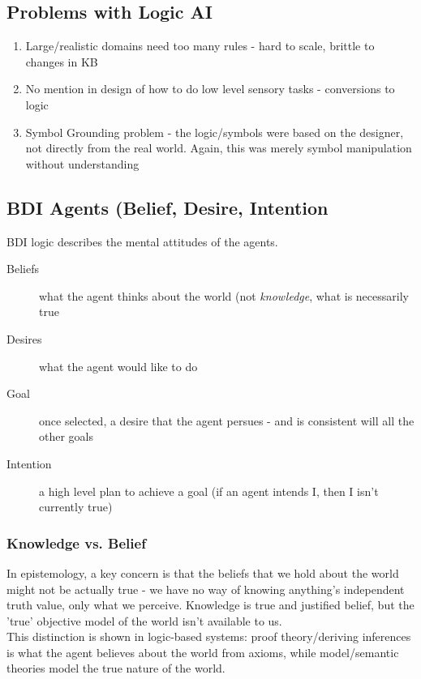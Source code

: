 \subsection{Problems with Logic AI}
\begin{enumerate}
    \item Large/realistic domains need too many rules - hard to scale, brittle to changes in KB
    \item No mention in design of how to do low level sensory tasks - conversions to logic
    \item Symbol Grounding problem - the logic/symbols were based on the designer, not directly from the real world. Again, this was merely symbol manipulation without understanding  
\end{enumerate}


\subsection{BDI Agents (Belief, Desire, Intention}
BDI logic describes the mental attitudes of the agents.
\begin{description}
    \item[Beliefs] what the agent thinks about the world (not \emph{knowledge}, what is necessarily true
    \item[Desires] what the agent would like to do
    \item[Goal] once selected, a desire that the agent persues - and is consistent will all the other goals
    \item[Intention] a high level plan to achieve a goal (if an agent intends I, then I isn't currently true)
\end{description}

\subsubsection{Knowledge vs. Belief}
In epistemology, a key concern is that the beliefs that we hold about the world might not be actually true - we have no way of knowing anything's independent truth value, only what we perceive. Knowledge is true and justified belief, but the 'true' objective model of the world isn't available to us.\\

This distinction is shown in logic-based systems: proof theory/deriving inferences is what the agent believes about the world from axioms, while model/semantic theories model the true nature of the world. 


